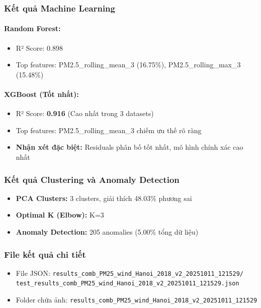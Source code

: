 \documentclass[12pt,a4paper]{article}
\begin{document}
\subsubsection{Kết quả Machine Learning}

\paragraph{Random Forest:}
\begin{itemize}
    \item R² Score: 0.898
    \item Top features: PM2.5\_rolling\_mean\_3 (16.75\%), PM2.5\_rolling\_max\_3 (15.48\%)
\end{itemize}

\paragraph{XGBoost (Tốt nhất):}
\begin{itemize}
    \item R² Score: \textbf{0.916} (Cao nhất trong 3 datasets)
    \item Top features: PM2.5\_rolling\_mean\_3 chiếm ưu thế rõ ràng
    \item \textbf{Nhận xét đặc biệt:} Residuals phân bố tốt nhất, mô hình chính xác cao nhất
\end{itemize}

\subsubsection{Kết quả Clustering và Anomaly Detection}
\begin{itemize}
    \item \textbf{PCA Clusters:} 3 clusters, giải thích 48.03\% phương sai
    \item \textbf{Optimal K (Elbow):} K=3
    \item \textbf{Anomaly Detection:} 205 anomalies (5.00\% tổng dữ liệu)
\end{itemize}

\subsubsection{File kết quả chi tiết}
\begin{itemize}
    \item File JSON: \texttt{results\_comb\_PM25\_wind\_Hanoi\_2018\_v2\_20251011\_121529/}\\
    \texttt{test\_results\_comb\_PM25\_wind\_Hanoi\_2018\_v2\_20251011\_121529.json}
    \item Folder chứa ảnh: \texttt{results\_comb\_PM25\_wind\_Hanoi\_2018\_v2\_20251011\_121529}
\end{itemize}
\end{document}
